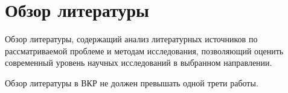 \chapter{Обзор литературы} \label{ch:review}

Обзор литературы, содержащий анализ литературных источников по рассматриваемой
проблеме и методам исследования, позволяющий оценить современный уровень
научных исследований в выбранном направлении.

Обзор литературы в ВКР не должен превышать одной трети работы.

